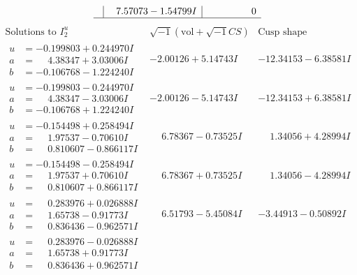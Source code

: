 \documentclass[1p]{elsarticle_modified}
\theoremstyle{definition}
\newcommand{\I}{\sqrt{-1}}
\begin{document}
$$\begin{array}{c|c|c}
 & \phantom{-}7.57073 - 1.54799 I & \phantom{-0.000000 } 0\\
 \hline 
 \end{array}$$\newpage$$\begin{array}{c|c|c}  
\text{Solutions to }I^u_{2}& \I (\text{vol} + \sqrt{-1}CS) & \text{Cusp shape}\\
 \hline 
\begin{aligned}
u &= -0.199803 + 0.244970 I \\
a &= \phantom{-}4.38347 + 3.03006 I \\
b &= -0.106768 - 1.224240 I\end{aligned}
 & -2.00126 + 5.14743 I & -12.34153 - 6.38581 I \\ \hline\begin{aligned}
u &= -0.199803 - 0.244970 I \\
a &= \phantom{-}4.38347 - 3.03006 I \\
b &= -0.106768 + 1.224240 I\end{aligned}
 & -2.00126 - 5.14743 I & -12.34153 + 6.38581 I \\ \hline\begin{aligned}
u &= -0.154498 + 0.258494 I \\
a &= \phantom{-}1.97537 - 0.70610 I \\
b &= \phantom{-}0.810607 - 0.866117 I\end{aligned}
 & \phantom{-}6.78367 - 0.73525 I & \phantom{-}1.34056 + 4.28994 I \\ \hline\begin{aligned}
u &= -0.154498 - 0.258494 I \\
a &= \phantom{-}1.97537 + 0.70610 I \\
b &= \phantom{-}0.810607 + 0.866117 I\end{aligned}
 & \phantom{-}6.78367 + 0.73525 I & \phantom{-}1.34056 - 4.28994 I \\ \hline\begin{aligned}
u &= \phantom{-}0.283976 + 0.026888 I \\
a &= \phantom{-}1.65738 - 0.91773 I \\
b &= \phantom{-}0.836436 - 0.962571 I\end{aligned}
 & \phantom{-}6.51793 - 5.45084 I & -3.44913 - 0.50892 I \\ \hline\begin{aligned}
u &= \phantom{-}0.283976 - 0.026888 I \\
a &= \phantom{-}1.65738 + 0.91773 I \\
b &= \phantom{-}0.836436 + 0.962571 I\end{aligned}

\end{array}$$
\end{document}
